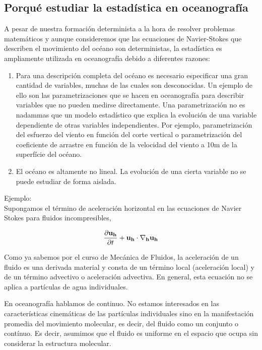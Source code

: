 \documentclass[
]{agujournal2019}
\begin{document}
\subsection{Porqué estudiar la estadística en oceanografía}

A pesar de nuestra formación determinista a la hora de resolver
problemas matemáticos y aunque consideremos que las ecuaciones de
Navier-Stokes que describen el movimiento del océano son deterministas,
la estadística es ampliamente utilizada en oceanografía debido a
diferentes razones:

\begin{enumerate}
\def\labelenumi{\arabic{enumi}.}
\item
  Para una descripción completa del océano es necesario especificar una
  gran cantidad de variables, muchas de las cuales son desconocidas. Un
  ejemplo de ello son las parametrizaciones que se hacen en oceanografía
  para describir variables que no pueden medirse directamente. Una
  parametrización no es nadammas que un modelo estadístico que explica
  la evolución de una variable dependiente de otras variables
  independientes. Por ejemplo, parametrización del esfuerzo del viento
  en función del corte vertical o parametrización del coeficiente de
  arrastre en función de la velocidad del viento a 10m de la superfície
  del océano.
\item
  El océano es altamente no lineal. La evolución de una cierta variable
  no se puede estudiar de forma aislada.
\end{enumerate}

\vspace{0.5cm}

Ejemplo:\\
Supongamos el término de aceleración horizontal en las ecuaciones de
Navier Stokes para fluidos incompresibles,

\[\frac{\partial{\bf {u}_h}}{\partial{t}} + \bf {u}_h \cdot {\nabla}_h \bf {{u}_h}\]

Como ya sabemos por el curso de Mecánica de Fluidos, la aceleración de
un fluido es una derivada material y consta de un término local
(aceleración local) y de un término advectivo o aceleración advectiva.
En general, esta ecuación no se aplica a partículas de agua
individuales.

En oceanografía hablamos de continuo. No estamos interesados en las
características cinemáticas de las partículas individuales sino en la
manifestación promedia del movimiento molecular, es decir, del fluido
como un conjunto o contínuo. Es decir, asumimos que el fluido es
uniforme en el espacio que ocupa sin considerar la estructura molecular.
\end{document}
